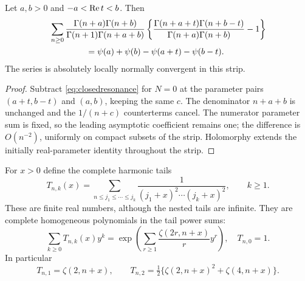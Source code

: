 \begin{proposition}\label{prop:balanced}
Let $a,b>0$ and $-a<\operatorname{Re} t<b$.  Then
\begin{align}
 &\sum_{n\ge0}\frac{\Gamma(n+a)\Gamma(n+b)}
                    {\Gamma(n+1)\Gamma(n+a+b)}
 \left\{\frac{\Gamma(n+a+t)\Gamma(n+b-t)}
                    {\Gamma(n+a)\Gamma(n+b)}-1\right\}\notag\\
 &\hspace{15mm}=\psi(a)+\psi(b)-\psi(a+t)-\psi(b-t).
 \label{eq:balanced}
\end{align}
The series is absolutely locally normally convergent in this strip.
\end{proposition}
\begin{proof}
Subtract \eqref{eq:closedresonance} for $N=0$ at the parameter pairs
$(a+t,b-t)$ and $(a,b)$, keeping the same $c$.  The denominator
$n+a+b$ is unchanged and the $1/(n+c)$ counterterms cancel.
The numerator parameter sum is fixed, so the leading asymptotic coefficient
remains one; the difference is $O(n^{-2})$, uniformly on compact subsets
of the strip.  Holomorphy extends the initially real-parameter identity
throughout the strip.
\end{proof}

For $x>0$ define the complete harmonic tails
\begin{equation}\label{eq:taildefinition}
 T_{n,k}(x)=\sum_{n\le j_1\le\cdots\le j_k}
       \frac1{(j_1+x)^2\cdots(j_k+x)^2},\qquad k\ge1.
\end{equation}
These are finite real numbers, although the nested tails are infinite.
They are complete homogeneous polynomials in the tail power sums:
\begin{equation}\label{eq:tailbell}
 \sum_{k\ge0}T_{n,k}(x)y^k
 =\exp\left(\sum_{r\ge1}\frac{\zeta(2r,n+x)}r y^r\right),
 \quad T_{n,0}=1.
\end{equation}
In particular
\[
 T_{n,1}=\zeta(2,n+x),\qquad
 T_{n,2}=\tfrac12\bigl\{\zeta(2,n+x)^2+\zeta(4,n+x)\bigr\}.
\]

